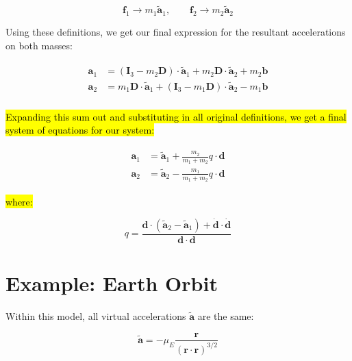 \documentclass[]{article}
\begin{document}
	\begin{equation*}
		\mathbf{f}_1 \rightarrow m_1 \tilde{\mathbf{a}}_1, \quad\quad \mathbf{f}_2 \rightarrow m_2 \tilde{\mathbf{a}}_2
	\end{equation*}

	Using these definitions, we get our final expression for the resultant accelerations on both masses:

	\begin{align}
	\begin{split}
		\mathbf{a}_1 &= (\mathbf{I}_3 - m_2 \mathbf{D}) \cdot \tilde{\mathbf{a}}_1 + m_2 \mathbf{D} \cdot \tilde{\mathbf{a}}_2 + m_2 \mathbf{b} \\
		\mathbf{a}_2 &= m_1 \mathbf{D} \cdot \tilde{\mathbf{a}}_1 + (\mathbf{I}_3 - m_1 \mathbf{D}) \cdot \tilde{\mathbf{a}}_2 - m_1 \mathbf{b} \\
	\end{split}
	\end{align}

	\hl{Expanding this sum out and substituting in all original definitions, we get a final system of equations for our system:}

	\begin{align}
		\begin{split}
			\mathbf{a}_1 &= \tilde{\mathbf{a}}_1 + \frac{m_2}{m_1 + m_2} q \cdot \mathbf{d}  \\
			\mathbf{a}_2 &= \tilde{\mathbf{a}}_2 - \frac{m_1}{m_1 + m_2} q \cdot \mathbf{d}
		\end{split}
	\end{align}

	\hl{where:}

	\begin{equation*}
		q = \frac{ \mathbf{d} \cdot (\tilde{\mathbf{a}}_2 - \tilde{\mathbf{a}}_1) + \dot{\mathbf{d}} \cdot \dot{\mathbf{d}} }{ \mathbf{d} \cdot \mathbf{d} }
	\end{equation*}





	\section{Example:  Earth Orbit}

	Within this model, all virtual accelerations $\tilde{\mathbf{a}}$ are the same:

	\begin{equation*}
		\tilde{\mathbf{a}} = -\mu_E \frac{\mathbf{r}}{(\mathbf{r} \cdot \mathbf{r})^{3/2}}
	\end{equation*}
\end{document}
